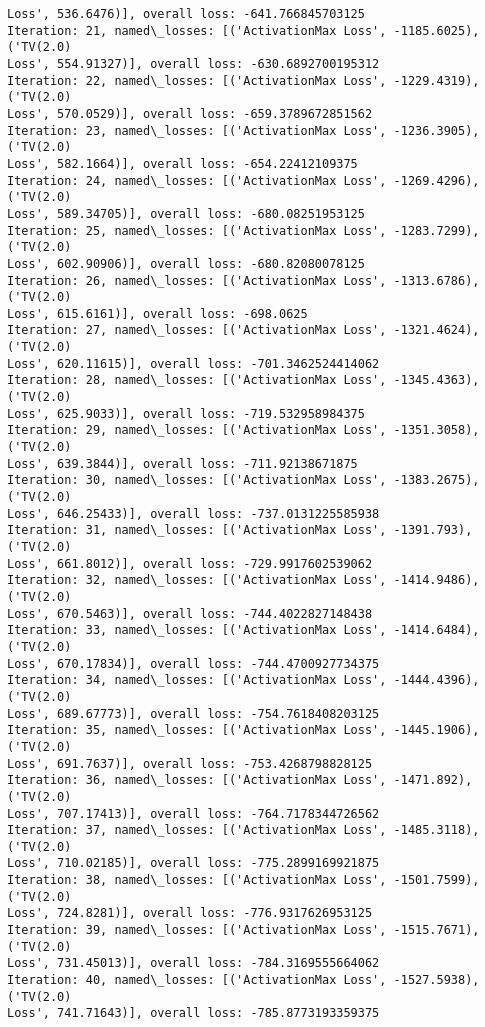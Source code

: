 \documentclass[10pt]{article}
\begin{document}
\begin{Verbatim}[commandchars=\\\{\}]
Loss', 536.6476)], overall loss: -641.766845703125
Iteration: 21, named\_losses: [('ActivationMax Loss', -1185.6025), ('TV(2.0)
Loss', 554.91327)], overall loss: -630.6892700195312
Iteration: 22, named\_losses: [('ActivationMax Loss', -1229.4319), ('TV(2.0)
Loss', 570.0529)], overall loss: -659.3789672851562
Iteration: 23, named\_losses: [('ActivationMax Loss', -1236.3905), ('TV(2.0)
Loss', 582.1664)], overall loss: -654.22412109375
Iteration: 24, named\_losses: [('ActivationMax Loss', -1269.4296), ('TV(2.0)
Loss', 589.34705)], overall loss: -680.08251953125
Iteration: 25, named\_losses: [('ActivationMax Loss', -1283.7299), ('TV(2.0)
Loss', 602.90906)], overall loss: -680.82080078125
Iteration: 26, named\_losses: [('ActivationMax Loss', -1313.6786), ('TV(2.0)
Loss', 615.6161)], overall loss: -698.0625
Iteration: 27, named\_losses: [('ActivationMax Loss', -1321.4624), ('TV(2.0)
Loss', 620.11615)], overall loss: -701.3462524414062
Iteration: 28, named\_losses: [('ActivationMax Loss', -1345.4363), ('TV(2.0)
Loss', 625.9033)], overall loss: -719.532958984375
Iteration: 29, named\_losses: [('ActivationMax Loss', -1351.3058), ('TV(2.0)
Loss', 639.3844)], overall loss: -711.92138671875
Iteration: 30, named\_losses: [('ActivationMax Loss', -1383.2675), ('TV(2.0)
Loss', 646.25433)], overall loss: -737.0131225585938
Iteration: 31, named\_losses: [('ActivationMax Loss', -1391.793), ('TV(2.0)
Loss', 661.8012)], overall loss: -729.9917602539062
Iteration: 32, named\_losses: [('ActivationMax Loss', -1414.9486), ('TV(2.0)
Loss', 670.5463)], overall loss: -744.4022827148438
Iteration: 33, named\_losses: [('ActivationMax Loss', -1414.6484), ('TV(2.0)
Loss', 670.17834)], overall loss: -744.4700927734375
Iteration: 34, named\_losses: [('ActivationMax Loss', -1444.4396), ('TV(2.0)
Loss', 689.67773)], overall loss: -754.7618408203125
Iteration: 35, named\_losses: [('ActivationMax Loss', -1445.1906), ('TV(2.0)
Loss', 691.7637)], overall loss: -753.4268798828125
Iteration: 36, named\_losses: [('ActivationMax Loss', -1471.892), ('TV(2.0)
Loss', 707.17413)], overall loss: -764.7178344726562
Iteration: 37, named\_losses: [('ActivationMax Loss', -1485.3118), ('TV(2.0)
Loss', 710.02185)], overall loss: -775.2899169921875
Iteration: 38, named\_losses: [('ActivationMax Loss', -1501.7599), ('TV(2.0)
Loss', 724.8281)], overall loss: -776.9317626953125
Iteration: 39, named\_losses: [('ActivationMax Loss', -1515.7671), ('TV(2.0)
Loss', 731.45013)], overall loss: -784.3169555664062
Iteration: 40, named\_losses: [('ActivationMax Loss', -1527.5938), ('TV(2.0)
Loss', 741.71643)], overall loss: -785.8773193359375

\end{Verbatim}
\end{document}
